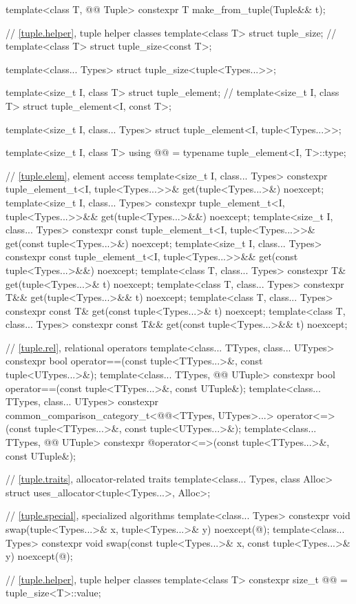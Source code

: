 \begin{codeblock}
{  template<class T, @@ Tuple>
    constexpr T make_from_tuple(Tuple&& t);

  // \ref{tuple.helper}, tuple helper classes
  template<class T> struct tuple_size;                  // \notdef
  template<class T> struct tuple_size<const T>;

  template<class... Types> struct tuple_size<tuple<Types...>>;

  template<size_t I, class T> struct tuple_element;     // \notdef
  template<size_t I, class T> struct tuple_element<I, const T>;

  template<size_t I, class... Types>
    struct tuple_element<I, tuple<Types...>>;

  template<size_t I, class T>
    using @@ = typename tuple_element<I, T>::type;

  // \ref{tuple.elem}, element access
  template<size_t I, class... Types>
    constexpr tuple_element_t<I, tuple<Types...>>& get(tuple<Types...>&) noexcept;
  template<size_t I, class... Types>
    constexpr tuple_element_t<I, tuple<Types...>>&& get(tuple<Types...>&&) noexcept;
  template<size_t I, class... Types>
    constexpr const tuple_element_t<I, tuple<Types...>>& get(const tuple<Types...>&) noexcept;
  template<size_t I, class... Types>
    constexpr const tuple_element_t<I, tuple<Types...>>&& get(const tuple<Types...>&&) noexcept;
  template<class T, class... Types>
    constexpr T& get(tuple<Types...>& t) noexcept;
  template<class T, class... Types>
    constexpr T&& get(tuple<Types...>&& t) noexcept;
  template<class T, class... Types>
    constexpr const T& get(const tuple<Types...>& t) noexcept;
  template<class T, class... Types>
    constexpr const T&& get(const tuple<Types...>&& t) noexcept;

  // \ref{tuple.rel}, relational operators
  template<class... TTypes, class... UTypes>
    constexpr bool operator==(const tuple<TTypes...>&, const tuple<UTypes...>&);
  template<class... TTypes, @@ UTuple>
    constexpr bool operator==(const tuple<TTypes...>&, const UTuple&);
  template<class... TTypes, class... UTypes>
    constexpr common_comparison_category_t<@@<TTypes, UTypes>...>
      operator<=>(const tuple<TTypes...>&, const tuple<UTypes...>&);
  template<class... TTypes, @@ UTuple>
    constexpr @\seebelownc@ operator<=>(const tuple<TTypes...>&, const UTuple&);

  // \ref{tuple.traits}, allocator-related traits
  template<class... Types, class Alloc>
    struct uses_allocator<tuple<Types...>, Alloc>;

  // \ref{tuple.special}, specialized algorithms
  template<class... Types>
    constexpr void swap(tuple<Types...>& x, tuple<Types...>& y) noexcept(@\seebelow@);
  template<class... Types>
    constexpr void swap(const tuple<Types...>& x, const tuple<Types...>& y) noexcept(@\seebelow@);

  // \ref{tuple.helper}, tuple helper classes
  template<class T>
    constexpr size_t @@ = tuple_size<T>::value;
}
\end{codeblock}

